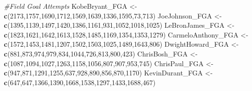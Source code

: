 \documentclass[
]{article}
\newenvironment{Shaded}{\begin{snugshade}}{\end{snugshade}}
\newcommand{\CommentTok}[1]{\textcolor[rgb]{0.56,0.35,0.01}{\textit{#1}}}
\newcommand{\DecValTok}[1]{\textcolor[rgb]{0.00,0.00,0.81}{#1}}
\newcommand{\KeywordTok}[1]{\textcolor[rgb]{0.13,0.29,0.53}{\textbf{#1}}}
\newcommand{\NormalTok}[1]{#1}
\newcommand{\StringTok}[1]{\textcolor[rgb]{0.31,0.60,0.02}{#1}}
\begin{document}
\begin{Shaded}
\begin{Highlighting}[]
\CommentTok{#Field Goal Attempts}
\NormalTok{KobeBryant_FGA <-}\StringTok{ }\KeywordTok{c}\NormalTok{(}\DecValTok{2173}\NormalTok{,}\DecValTok{1757}\NormalTok{,}\DecValTok{1690}\NormalTok{,}\DecValTok{1712}\NormalTok{,}\DecValTok{1569}\NormalTok{,}\DecValTok{1639}\NormalTok{,}\DecValTok{1336}\NormalTok{,}\DecValTok{1595}\NormalTok{,}\DecValTok{73}\NormalTok{,}\DecValTok{713}\NormalTok{)}
\NormalTok{JoeJohnson_FGA <-}\StringTok{ }\KeywordTok{c}\NormalTok{(}\DecValTok{1395}\NormalTok{,}\DecValTok{1139}\NormalTok{,}\DecValTok{1497}\NormalTok{,}\DecValTok{1420}\NormalTok{,}\DecValTok{1386}\NormalTok{,}\DecValTok{1161}\NormalTok{,}\DecValTok{931}\NormalTok{,}\DecValTok{1052}\NormalTok{,}\DecValTok{1018}\NormalTok{,}\DecValTok{1025}\NormalTok{)}
\NormalTok{LeBronJames_FGA <-}\StringTok{ }\KeywordTok{c}\NormalTok{(}\DecValTok{1823}\NormalTok{,}\DecValTok{1621}\NormalTok{,}\DecValTok{1642}\NormalTok{,}\DecValTok{1613}\NormalTok{,}\DecValTok{1528}\NormalTok{,}\DecValTok{1485}\NormalTok{,}\DecValTok{1169}\NormalTok{,}\DecValTok{1354}\NormalTok{,}\DecValTok{1353}\NormalTok{,}\DecValTok{1279}\NormalTok{)}
\NormalTok{CarmeloAnthony_FGA <-}\StringTok{ }\KeywordTok{c}\NormalTok{(}\DecValTok{1572}\NormalTok{,}\DecValTok{1453}\NormalTok{,}\DecValTok{1481}\NormalTok{,}\DecValTok{1207}\NormalTok{,}\DecValTok{1502}\NormalTok{,}\DecValTok{1503}\NormalTok{,}\DecValTok{1025}\NormalTok{,}\DecValTok{1489}\NormalTok{,}\DecValTok{1643}\NormalTok{,}\DecValTok{806}\NormalTok{)}
\NormalTok{DwightHoward_FGA <-}\StringTok{ }\KeywordTok{c}\NormalTok{(}\DecValTok{881}\NormalTok{,}\DecValTok{873}\NormalTok{,}\DecValTok{974}\NormalTok{,}\DecValTok{979}\NormalTok{,}\DecValTok{834}\NormalTok{,}\DecValTok{1044}\NormalTok{,}\DecValTok{726}\NormalTok{,}\DecValTok{813}\NormalTok{,}\DecValTok{800}\NormalTok{,}\DecValTok{423}\NormalTok{)}
\NormalTok{ChrisBosh_FGA <-}\StringTok{ }\KeywordTok{c}\NormalTok{(}\DecValTok{1087}\NormalTok{,}\DecValTok{1094}\NormalTok{,}\DecValTok{1027}\NormalTok{,}\DecValTok{1263}\NormalTok{,}\DecValTok{1158}\NormalTok{,}\DecValTok{1056}\NormalTok{,}\DecValTok{807}\NormalTok{,}\DecValTok{907}\NormalTok{,}\DecValTok{953}\NormalTok{,}\DecValTok{745}\NormalTok{)}
\NormalTok{ChrisPaul_FGA <-}\StringTok{ }\KeywordTok{c}\NormalTok{(}\DecValTok{947}\NormalTok{,}\DecValTok{871}\NormalTok{,}\DecValTok{1291}\NormalTok{,}\DecValTok{1255}\NormalTok{,}\DecValTok{637}\NormalTok{,}\DecValTok{928}\NormalTok{,}\DecValTok{890}\NormalTok{,}\DecValTok{856}\NormalTok{,}\DecValTok{870}\NormalTok{,}\DecValTok{1170}\NormalTok{)}
\NormalTok{KevinDurant_FGA <-}\StringTok{ }\KeywordTok{c}\NormalTok{(}\DecValTok{647}\NormalTok{,}\DecValTok{647}\NormalTok{,}\DecValTok{1366}\NormalTok{,}\DecValTok{1390}\NormalTok{,}\DecValTok{1668}\NormalTok{,}\DecValTok{1538}\NormalTok{,}\DecValTok{1297}\NormalTok{,}\DecValTok{1433}\NormalTok{,}\DecValTok{1688}\NormalTok{,}\DecValTok{467}\NormalTok{)}

\end{Highlighting}
\end{Shaded}
\end{document}
